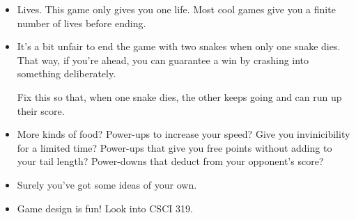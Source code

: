 \documentclass[12pt]{article}
\begin{document}
\begin{description}
\begin{itemize}
\item Lives.  This game only gives you one life.  Most cool
games give you a finite number of lives before ending.

\item It's a bit unfair to end the game with two snakes when
only one snake dies.  That way, if you're ahead, you can 
guarantee a win by crashing into something deliberately.

Fix this so that, when one snake dies, the other keeps going
and can run up their score.

\item More kinds of food?  Power-ups to increase your speed?
Give you invinicibility for a limited time?  Power-ups that give
you free points without adding to your tail length?  Power-downs
that deduct from your opponent's score?

\item Surely you've got some ideas of your own. 

\item Game design is fun!
Look into CSCI 319.
\end{itemize}




\end{description}
\end{document}
